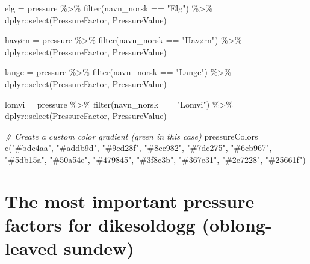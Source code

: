 \documentclass[
]{book}
\newenvironment{Shaded}{\begin{snugshade}}{\end{snugshade}}
\newcommand{\CommentTok}[1]{\textcolor[rgb]{0.56,0.35,0.01}{\textit{#1}}}
\newcommand{\FunctionTok}[1]{\textcolor[rgb]{0.00,0.00,0.00}{#1}}
\newcommand{\NormalTok}[1]{#1}
\newcommand{\OtherTok}[1]{\textcolor[rgb]{0.56,0.35,0.01}{#1}}
\newcommand{\SpecialCharTok}[1]{\textcolor[rgb]{0.00,0.00,0.00}{#1}}
\newcommand{\StringTok}[1]{\textcolor[rgb]{0.31,0.60,0.02}{#1}}
\begin{document}
\begin{Shaded}
\begin{Highlighting}[]
\NormalTok{elg }\OtherTok{=}\NormalTok{ pressure }\SpecialCharTok{\%\textgreater{}\%} \FunctionTok{filter}\NormalTok{(navn\_norsk }\SpecialCharTok{==} \StringTok{"Elg"}\NormalTok{) }\SpecialCharTok{\%\textgreater{}\%}\NormalTok{ dplyr}\SpecialCharTok{::}\FunctionTok{select}\NormalTok{(PressureFactor, PressureValue)}

\NormalTok{havørn }\OtherTok{=}\NormalTok{ pressure }\SpecialCharTok{\%\textgreater{}\%} \FunctionTok{filter}\NormalTok{(navn\_norsk }\SpecialCharTok{==} \StringTok{"Havørn"}\NormalTok{) }\SpecialCharTok{\%\textgreater{}\%}\NormalTok{ dplyr}\SpecialCharTok{::}\FunctionTok{select}\NormalTok{(PressureFactor, PressureValue)}

\NormalTok{lange }\OtherTok{=}\NormalTok{ pressure }\SpecialCharTok{\%\textgreater{}\%} \FunctionTok{filter}\NormalTok{(navn\_norsk }\SpecialCharTok{==} \StringTok{"Lange"}\NormalTok{) }\SpecialCharTok{\%\textgreater{}\%}\NormalTok{ dplyr}\SpecialCharTok{::}\FunctionTok{select}\NormalTok{(PressureFactor, PressureValue)}

\NormalTok{lomvi }\OtherTok{=}\NormalTok{ pressure }\SpecialCharTok{\%\textgreater{}\%} \FunctionTok{filter}\NormalTok{(navn\_norsk }\SpecialCharTok{==} \StringTok{"Lomvi"}\NormalTok{) }\SpecialCharTok{\%\textgreater{}\%}\NormalTok{ dplyr}\SpecialCharTok{::}\FunctionTok{select}\NormalTok{(PressureFactor, PressureValue)}

\CommentTok{\# Create a custom color gradient (green in this case)}
\NormalTok{pressureColors }\OtherTok{=} \FunctionTok{c}\NormalTok{(}\StringTok{"\#bde4aa"}\NormalTok{, }\StringTok{"\#addb9d"}\NormalTok{, }\StringTok{"\#9cd28f"}\NormalTok{, }\StringTok{"\#8cc982"}\NormalTok{, }\StringTok{"\#7dc275"}\NormalTok{, }\StringTok{"\#6cb967"}\NormalTok{, }\StringTok{"\#5db15a"}\NormalTok{, }\StringTok{"\#50a54e"}\NormalTok{, }\StringTok{"\#479845"}\NormalTok{, }\StringTok{"\#3f8c3b"}\NormalTok{, }\StringTok{"\#367e31"}\NormalTok{, }\StringTok{"\#2e7228"}\NormalTok{, }\StringTok{"\#25661f"}\NormalTok{) }
\end{Highlighting}
\end{Shaded}

\hypertarget{the-most-important-pressure-factors-for-dikesoldogg-oblong-leaved-sundew}{%
\section{The most important pressure factors for dikesoldogg (oblong-leaved sundew)}\label{the-most-important-pressure-factors-for-dikesoldogg-oblong-leaved-sundew}}
\end{document}
